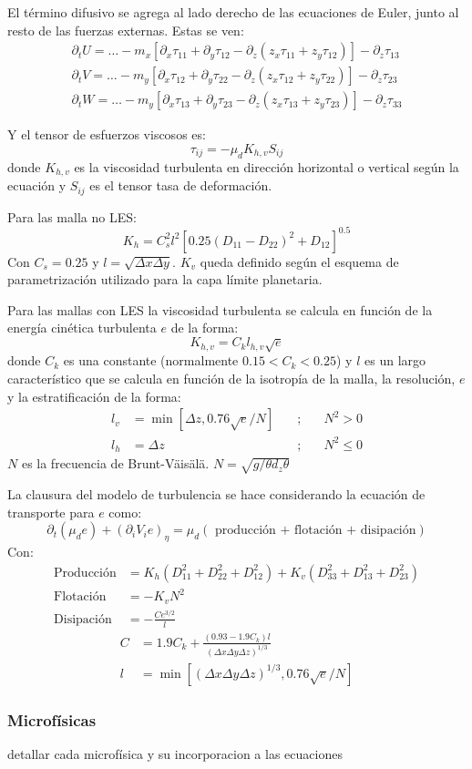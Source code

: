 El término difusivo se agrega al lado derecho de las ecuaciones de Euler, junto al resto de las fuerzas externas. Estas se ven:
\begin{eqnarray}
\partial_t U = \ldots - m_x[\partial_x\tau_{11}+\partial_y\tau_{12}-\partial_z(z_x\tau_{11}+z_y\tau_{12})]-\partial_z\tau_{13} \\
\partial_t V = \ldots - m_y[\partial_x\tau_{12}+\partial_y\tau_{22}-\partial_z(z_x\tau_{12}+z_y\tau_{22})]-\partial_z\tau_{23} \\
\partial_t W = \ldots - m_y[\partial_x\tau_{13}+\partial_y\tau_{23}-\partial_z(z_x\tau_{13}+z_y\tau_{23})]-\partial_z\tau_{33}
\end{eqnarray}

Y el tensor de esfuerzos viscosos es:
\begin{equation}
\tau_{ij} = -\mu_d K_{h,v}S_{ij}
\end{equation}
donde $K_{h,v}$ es la viscosidad turbulenta en dirección horizontal o vertical según la ecuación y $S_{ij}$ es el tensor tasa de deformación.

Para las malla no LES:
\begin{equation}
K_h = C_s^2 l^2[0.25(D_{11}-D_{22})^2+D_{12}]^{0.5}
\end{equation}
Con $C_s=0.25$ y $l=\sqrt{\Delta x\Delta y}$. $K_v$ queda definido según el esquema de parametrización utilizado para la capa límite planetaria.

Para las mallas con LES
la viscosidad turbulenta se calcula en función de la energía cinética turbulenta $e$ de la forma:
\begin{equation}
K_{h,v}=C_k l_{h,v}\sqrt{e}
\end{equation}
donde $C_k$ es una constante (normalmente $0.15<C_k<0.25$) y $l$ es un largo característico que se calcula en función de la isotropía de la malla, la resolución, $e$ y la estratificación de la forma:
\begin{align}
	l_v &= \min[\Delta z, 0.76\sqrt{e}/N]\quad&;&\quad N^2>0\\
	l_h &= \Delta z\quad&;&\quad N^2\leq 0
\end{align}
$N$ es la frecuencia de Brunt-Väisälä. $N=\sqrt{g/\theta d_z\theta}$

La clausura del modelo de turbulencia se hace considerando la ecuación de transporte para $e$ como:
\begin{equation}
\partial_t(\mu_d e) + (\partial_i V_i e)_\eta = \mu_d(\text{ producción + flotación + disipación})
\end{equation}
Con:
\begin{align}
	\text{Producción}&= K_h (D_{11}^2 + D_{22}^2 + D_{12}^2) + K_v (D_{33}^2 + D_{13}^2 + D_{23}^2)\\
	\text{Flotación}&=-K_v N^2\\
	\text{Disipación}&=-\frac{C e^{3/2}}{l}
\end{align}
\begin{align}
	C &= 1.9C_k + \frac{(0.93 - 1.9 C_k)l}{(\Delta x \Delta y \Delta z)^{1/3}}\\
	l &= \min[(\Delta x \Delta y \Delta z)^{1/3}, 0.76\sqrt{e}/N]
\end{align}
\subsubsection{Microfísicas}
detallar cada microfísica y su incorporacion a las ecuaciones